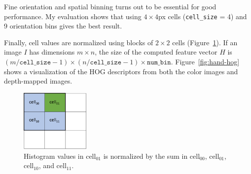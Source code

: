 Fine orientation and spatial binning turns out to be essential for good
performance. My evaluation shows that using $4\times 4$px cells
(\texttt{cell\_size} = 4) and 9 orientation bins gives the best result.

Finally, cell values are normalized using blocks of $2\times 2$ cells
(Figure~\ref{fig:cell}).
If an image $I$ has dimensions $m\times n$, the size of the computed feature vector
$H$ is $(m/\texttt{cell\_size} - 1) \times (n/\texttt{cell\_size} - 1) \times
\texttt{num\_bin}$. Figure~\ref{fig:hand-hog} shows a visualization of the HOG
descriptors from both the color images and depth-mapped images.

\begin{figure}[!tbh]
\centering
\includegraphics[width=0.3\textwidth]{figures/cell.png}
\caption{Histogram values in $\text{cell}_{01}$ is normalized by the sum in
$\text{cell}_{00}$, $\text{cell}_{01}$, $\text{cell}_{10}$,
and $\text{cell}_{11}$.
}
\label{fig:cell}
\end{figure}

